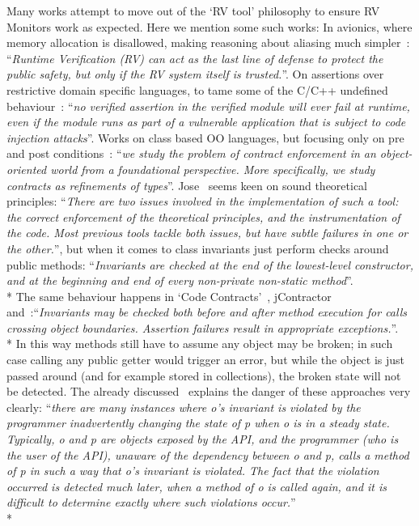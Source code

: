 \noindent Many works attempt to move out of the `RV tool' philosophy to ensure RV Monitors work as expected. Here
we mention some such works:
\sepItems
In avionics, where memory allocation is disallowed, making reasoning about aliasing much simpler~\cite{laurent2015assuring}:
``\emph{Runtime Verification (RV) can act as the last line of defense to
protect the public safety, but only if the RV system itself is trusted.}''.
\sepItems
On assertions over restrictive domain specific languages, to tame some of the C/C++
undefined behaviour~\cite{agten2015sound}:
``\emph{no verified assertion in the verified
module will ever fail at runtime, even if the module runs as part of
a vulnerable application that is subject to code injection attacks}''.
\sepItems
Works on class based OO languages, but focusing only on pre and post conditions~\cite{findler2001contract}:
``\emph{we  study  the  problem  of  contract  enforcement in
an object-oriented world from  a foundational perspective.   More
specifically, we study contracts as refinements of types}''.
\sepItems
Jose~\cite{feldman2006jose} seems keen on sound theoretical principles:
``\emph{There are two issues involved
in the implementation of such a tool: the correct enforcement of the theoretical principles, and the instrumentation
of the code. Most previous tools tackle both issues, but have
subtle failures in one or the other.}'',
but when it comes to class invariants just perform checks around public methods:
``\emph{Invariants are checked at the end of the lowest-level constructor,
 and at the beginning and end of every non-private non-static method}''.\\*
The same behaviour happens in `Code Contracts'~\cite{fahndrich2010embedded},
jContractor~\cite{abercrombie2002jcontractor}
and~\cite{tran2003design}:``\emph{Invariants may be checked both before and after
method  execution  for  calls  crossing  object  boundaries.
Assertion  failures  result  in  appropriate  exceptions.}''.\\*
In this way methods still have to assume any object may be broken; in such case calling any
public getter would trigger an error, but while the object is just passed around
(and for example stored in collections), the broken state will not be detected.
The already discussed~\cite{Gopinathan:2008:RMO:1483018.1483028}
explains the danger of these approaches very clearly:
``\emph{there are many instances where o's invariant is violated by the programmer inadvertently changing the state
of p when o is in a steady state. Typically, o and p
are objects exposed by the API, and the programmer (who is the user of the API), unaware of
the dependency between o and p, calls a method of p in such a way that
o's invariant is violated. The fact that the violation occurred is detected
much later, when a method of o is called again, and it is difficult to 
determine exactly where such violations occur.}''\\*
